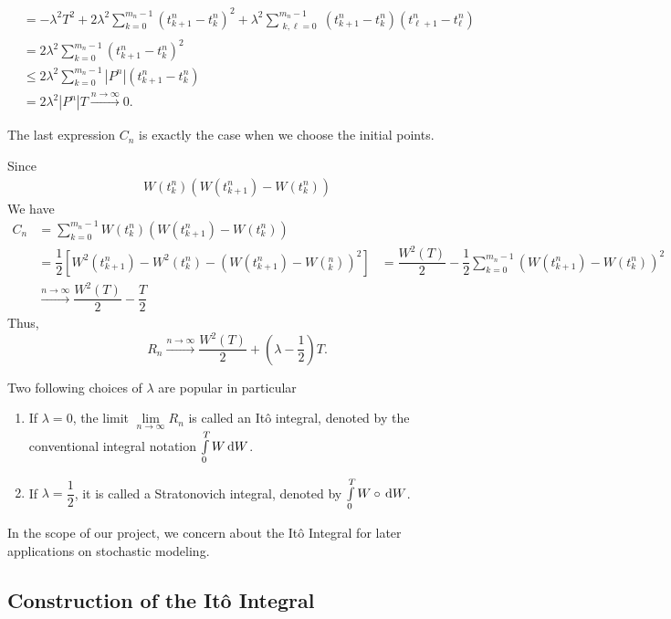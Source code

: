 \begin{solution}
\begin{align*}
     & = -\lambda^2 T^2 + 2\lambda^2\sum\limits_{k=0}^{m_n-1}(t_{k+1}^n-t_k^n)^2 + \lambda^2\sum\limits_{\substack{k,\ell=0}}^{m_n-1} (t_{k+1}^n-t_k^n)(t_{\ell+1}^n-t_\ell^n)                \\
     & = 2\lambda^2\sum\limits_{k=0}^{m_n-1}(t_{k+1}^n-t_k^n)^2                                                                                                                               \\
     & \le 2\lambda^2\sum\limits_{k=0}^{m_n-1}|P^n|(t_{k+1}^n-t_k^n)                                                                                                                          \\
     & = 2\lambda^2|P^n|T \xrightarrow{n\to\infty} 0.
  \end{align*}

  The last expression $C_n$ is exactly the case when we choose the initial points.

  Since
  \begin{align*}
    W(t_k^n)(W(t^n_{k+1})-W(t^n_k))
  \end{align*}
  We have
  \begin{align*}
    C_n
     & =\sum\limits_{k=0}^{m_n-1}W(t^n_k)(W(t^n_{k+1})-W(t^n_k))                          \\
     & = \dfrac{1}{2}\left[W^2(t^n_{k+1})-W^2(t^n_k)-(W(t^n_{k+1})-W(^n_k))^2\right]
     & =\dfrac{W^2(T)}{2} -\dfrac{1}{2}\sum\limits_{k=0}^{m_n-1}(W(t^n_{k+1})-W(t^n_k))^2 \\
     & \xrightarrow{n\to\infty} \dfrac{W^2(T)}{2} - \dfrac{T}{2}
  \end{align*}
  Thus,
  $$R_n \xrightarrow{n\to\infty} \dfrac{W^2(T)}{2} + \left(\lambda-\dfrac{1}{2}\right)T.$$
\end{solution}

Two following choices of $\lambda$ are popular in particular
\begin{enumerate}
  \item If $\lambda = 0$, the limit $\lim\limits_{n\to\infty}R_n$ is called an Itô integral, denoted by the conventional integral notation $\int\limits_0^T W\,\mathrm{d} W$.
  \item If $\lambda = \dfrac{1}{2}$, it is called a Stratonovich integral, denoted by $\int\limits_0^T W\circ\,\mathrm{d} W$.
\end{enumerate}

In the scope of our project, we concern about the Itô Integral for later applications on stochastic modeling.

\subsection{Construction of the Itô Integral}

